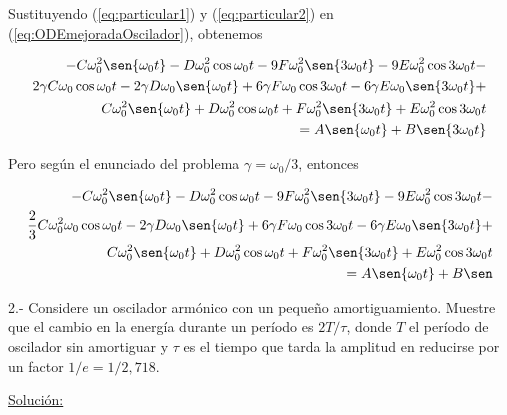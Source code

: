 \documentclass[a4paper,10pt]{article}
\begin{document}
Sustituyendo (\ref{eq:particular1}) y (\ref{eq:particular2}) en (\ref{eq:ODEmejoradaOscilador}),
obtenemos

\begin{align*}
%
 - C\omega_0^2 \sen{\omega_0t} - D\omega_0^2 \cos{\omega_0t} - 
  9F\omega_0^2 \sen{3 \omega_0t} - 9E\omega_0^2 \cos{3 \omega_0t} - \\
  2\gamma C \omega_0 \cos{\omega_0t} - 2\gamma D\omega_0 \sen{\omega_0t} + 
  6\gamma F\omega_0 \cos{3 \omega_0t} - 6\gamma E\omega_0 \sen{3 \omega_0t} + \\
  C\omega_0^2 \sen{\omega_0t} + D\omega_0^2 \cos{\omega_0t} + F\omega_0^2 
  \sen{3 \omega_0t} + E\omega_0^2 \cos{3 \omega_0t} \\
  = A \sen{\omega_0t} + B \sen{3\omega_0t}
\end{align*}

Pero según el enunciado del problema $\gamma = \omega_0/3$, entonces

\begin{align}
 \begin{split}
- C\omega_0^2 \sen{\omega_0t} - D\omega_0^2 \cos{\omega_0t} - 
  9F\omega_0^2 \sen{3 \omega_0t} - 9E\omega_0^2 \cos{3 \omega_0t} - \\
  \frac{2}{3} C \omega_0^2 \omega_0 \cos{\omega_0t} - 2\gamma D\omega_0 \sen{\omega_0t} + 
  6\gamma F\omega_0 \cos{3 \omega_0t} - 6\gamma E\omega_0 \sen{3 \omega_0t} + \\
  C\omega_0^2 \sen{\omega_0t} + D\omega_0^2 \cos{\omega_0t} + F\omega_0^2 
  \sen{3 \omega_0t} + E\omega_0^2 \cos{3 \omega_0t} \\
  = A \sen{\omega_0t} + B \sen
  \end{split}
\end{align}










\vspace{.3cm}

2.- Considere un oscilador armónico con un pequeño amortiguamiento.
Muestre que el cambio en la energía durante un período es $2T/\tau$,
donde $T$ el período de oscilador sin amortiguar y $\tau$ es el tiempo
que tarda la amplitud en reducirse por un factor $1/e=1/2,718$.

\vspace{.3cm}

\underline{Solución:}

\vspace{.3cm}
\end{document}
